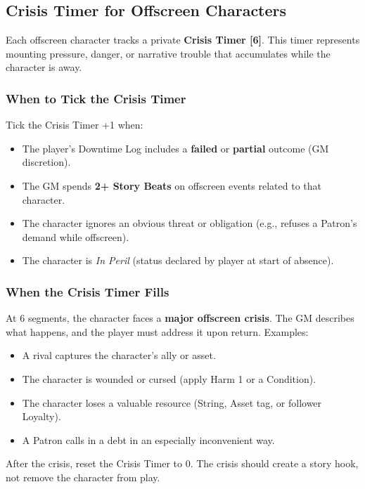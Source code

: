 \subsection{Crisis Timer for Offscreen Characters}
Each offscreen character tracks a private \textbf{Crisis Timer [6]}. This timer represents mounting pressure, danger, or narrative trouble that accumulates while the character is away.

\subsubsection{When to Tick the Crisis Timer }
Tick the Crisis Timer +1 when:
\begin{itemize}
  \item The player's Downtime Log includes a \textbf{failed} or \textbf{partial} outcome (GM discretion).
  \item The GM spends \textbf{2+ Story Beats} on offscreen events related to that character.
  \item The character ignores an obvious threat or obligation (e.g., refuses a Patron's demand while offscreen).
  \item The character is \textit{In Peril} (status declared by player at start of absence).
\end{itemize}

\subsubsection{When the Crisis Timer Fills}
At 6 segments, the character faces a \textbf{major offscreen crisis}. The GM describes what happens, and the player must address it upon return. Examples:
\begin{itemize}
  \item A rival captures the character's ally or asset.
  \item The character is wounded or cursed (apply Harm 1 or a Condition).
  \item The character loses a valuable resource (String, Asset tag, or follower Loyalty).
  \item A Patron calls in a debt in an especially inconvenient way.
\end{itemize}
After the crisis, reset the Crisis Timer to 0. The crisis should create a story hook, not remove the character from play.

